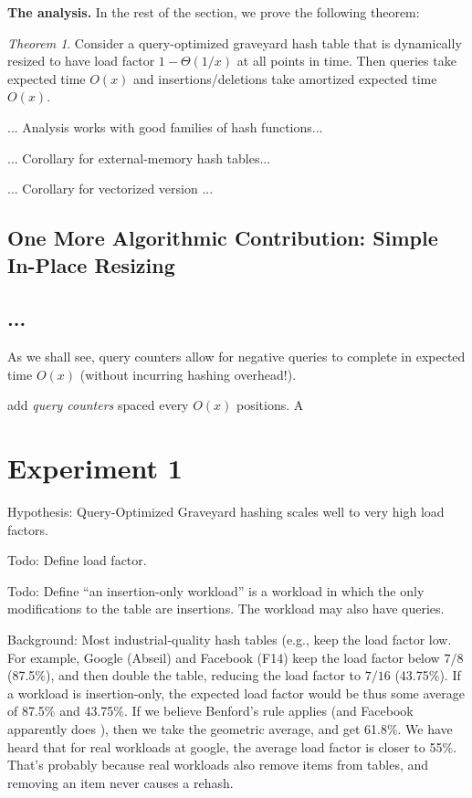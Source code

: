 \documentclass[10pt]{article}
\theoremstyle{remark}
\newtheorem{theorem}{Theorem}[section]
\theoremstyle{remark}
\renewcommand{\paragraph}[1]{\vspace{.2 cm} \noindent \textbf{#1}}
\begin{document}
\paragraph{The analysis.}
In the rest of the section, we prove the following theorem:
\begin{theorem}
Consider a query-optimized graveyard hash table that is dynamically resized to have load factor $1 - \Theta(1/x)$ at all points in time. Then queries take expected time $O(x)$ and insertions/deletions take amortized expected time $O(x)$. 
\end{theorem}

... Analysis works with good families of hash functions...

... Corollary for external-memory hash tables...

... Corollary for vectorized version ...


\subsection{One More Algorithmic Contribution: Simple In-Place Resizing}



\subsection{...}





As we shall see, query counters allow for negative queries to complete in expected time $O(x)$ (without incurring hashing overhead!). 


add \emph{query counters} spaced every $O(x)$ positions. A 


\section{Experiment 1}

Hypothesis: Query-Optimized Graveyard hashing scales well to very high
load factors.

Todo: Define load factor.

Todo: Define ``an insertion-only workload'' is a workload in which the
only modifications to the table are insertions.  The workload may also
have queries.

Background: Most industrial-quality hash tables (e.g., \cite{Abseil17,
  BronsonSh19} keep the load factor low.  For example, Google (Abseil)
and Facebook (F14) keep the load factor below $7/8$ (87.5\%), and then
double the table, reducing the load factor to $7/16$ (43.75\%).  If a
workload is insertion-only, the expected load factor would be thus
some average of 87.5\% and 43.75\%.  If we believe Benford's rule
\cite{Benford38} applies (and Facebook apparently does
\cite{BronsonSh19}), then we take the geometric average, and get
61.8\%.  We have heard that for real workloads at google, the average
load factor is closer to 55\%.  That's probably because real workloads
also remove items from tables, and removing an item never causes a
rehash.
\end{document}
